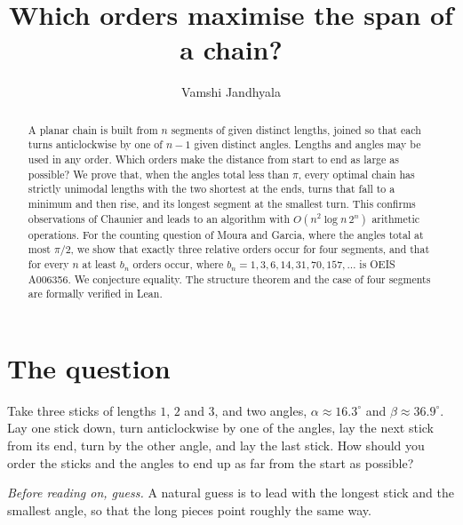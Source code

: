 \documentclass[11pt]{article}
\title{Which orders maximise the span of a chain?}
\author{Vamshi Jandhyala}
\date{}
\theoremstyle{remark}
\begin{document}
\maketitle
\vspace{-2em}

\begin{abstract}
A planar chain is built from $n$ segments of given distinct lengths, joined so that each turns anticlockwise by one of $n-1$ given distinct angles. Lengths and angles may be used in any order. Which orders make the distance from start to end as large as possible? We prove that, when the angles total less than $\pi$, every optimal chain has strictly unimodal lengths with the two shortest at the ends, turns that fall to a minimum and then rise, and its longest segment at the smallest turn. This confirms observations of Chaunier and leads to an algorithm with $O(n^2\log n\,2^n)$ arithmetic operations. For the counting question of Moura and Garcia, where the angles total at most $\pi/2$, we show that exactly three relative orders occur for four segments, and that for every $n$ at least $b_n$ orders occur, where $b_n=1,3,6,14,31,70,157,\dots$ is OEIS A006356. We conjecture equality. The structure theorem and the case of four segments are formally verified in Lean.
\end{abstract}

\section{The question}

Take three sticks of lengths $1$, $2$ and $3$, and two angles, $\alpha\approx16.3^\circ$ and $\beta\approx36.9^\circ$. Lay one stick down, turn anticlockwise by one of the angles, lay the next stick from its end, turn by the other angle, and lay the last stick. How should you order the sticks and the angles to end up as far from the start as possible?

\emph{Before reading on, guess.} A natural guess is to lead with the longest stick and the smallest angle, so that the long pieces point roughly the same way.
\end{document}

